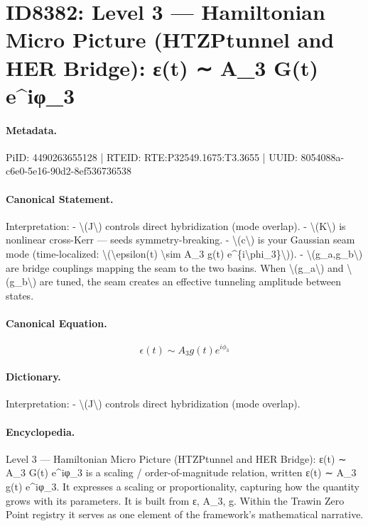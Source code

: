\section*{ID8382: Level 3 — Hamiltonian Micro Picture (HTZPtunnel and HER Bridge): ε(t) ∼ A\_3 G(t) e\textasciicircum{}iφ\_3}
\paragraph{Metadata.}
PiID: 4490263655128 | RTEID: RTE:P32549.1675:T3.3655 | UUID: 8054088a-c6e0-5e16-90d2-8ef536736538

\paragraph{Canonical Statement.}
Interpretation: - \textbackslash{}(J\textbackslash{}) controls direct hybridization (mode overlap). - \textbackslash{}(K\textbackslash{}) is nonlinear cross-Kerr — seeds symmetry-breaking. - \textbackslash{}(c\textbackslash{}) is your Gaussian seam mode (time-localized: \textbackslash{}(\textbackslash{}epsilon(t) \textbackslash{}sim A\_3 g(t) e\textasciicircum{}\{i\textbackslash{}phi\_3\}\textbackslash{})). - \textbackslash{}(g\_a,g\_b\textbackslash{}) are bridge couplings mapping the seam to the two basins. When \textbackslash{}(g\_a\textbackslash{}) and \textbackslash{}(g\_b\textbackslash{}) are tuned, the seam creates an effective tunneling amplitude between states.

\paragraph{Canonical Equation.}
\[
\epsilon(t) \sim A_3 g(t) e^{i\phi_3}
\]

\paragraph{Dictionary.}
Interpretation: - \textbackslash{}(J\textbackslash{}) controls direct hybridization (mode overlap).

\paragraph{Encyclopedia.}
Level 3 — Hamiltonian Micro Picture (HTZPtunnel and HER Bridge): ε(t) ∼ A\_3 G(t) e\textasciicircum{}iφ\_3 is a scaling / order-of-magnitude relation, written ε(t) ∼ A\_3 g(t) e\textasciicircum{}iφ\_3. It expresses a scaling or proportionality, capturing how the quantity grows with its parameters. It is built from ε, A\_3, g. Within the Trawin Zero Point registry it serves as one element of the framework's mathematical narrative.
